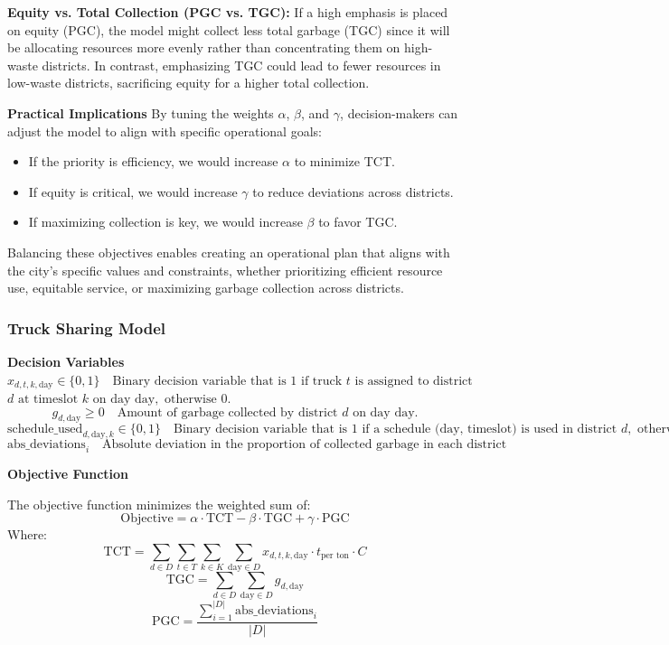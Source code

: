 \documentclass{article}
\begin{document}
\textbf{{Equity vs. Total Collection (PGC vs. TGC):}}
If a high emphasis is placed on equity (PGC), the model might collect less total garbage (TGC) since it will be allocating resources more evenly rather than concentrating them on high-waste districts. In contrast, emphasizing TGC could lead to fewer resources in low-waste districts, sacrificing equity for a higher total collection.

\textbf{{Practical Implications}}
By tuning the weights $\alpha$, $\beta$, and $\gamma$, decision-makers can adjust the model to align with specific operational goals:

\begin{itemize}
    \item If the priority is efficiency, we would increase $\alpha$ to minimize TCT.
    \item If equity is critical, we would increase $\gamma$ to reduce deviations across districts.
    \item If maximizing collection is key, we would increase $\beta$ to favor TGC.
\end{itemize}

Balancing these objectives enables creating an operational plan that aligns with the city’s specific values and constraints, whether prioritizing efficient resource use, equitable service, or maximizing garbage collection across districts.



\subsubsection{Truck Sharing Model}

\textbf{Decision Variables}
$
x_{d,t,k,\text{day}} \in \{0,1\} \quad \text{Binary decision variable that is 1 if truck }  t \text{ is assigned to district }$ $ d \text{ at timeslot } k 
\text{ on day } \text{day}, \text{ otherwise 0.}
$
\[
g_{d,\text{day}} \geq 0 \quad \text{Amount of garbage collected by district } d \text{ on day } \text{day.}
\]
\[
\text{schedule\_used}_{d,\text{day},k} \in \{0, 1\} \quad \text{Binary decision variable that is 1 if a schedule (day, timeslot) is used in district } d, \text{ otherwise 0.}
\]
\[
\text{abs\_deviations}_i \quad \text{Absolute deviation in the proportion of collected garbage in each district compared to the mean proportion.}
\]

\textbf{Objective Function}

The objective function minimizes the weighted sum of:
\[
\text{Objective} = \alpha \cdot \text{TCT} - \beta \cdot \text{TGC} + \gamma \cdot \text{PGC}
\]
Where:
\[
\text{TCT} = \sum_{d \in D} \sum_{t \in T} \sum_{k \in K} \sum_{\text{day} \in D} x_{d,t,k,\text{day}} \cdot t_{\text{per ton}} \cdot C
\]
\[
\text{TGC} = \sum_{d \in D} \sum_{\text{day} \in D} g_{d,\text{day}}
\]
\[
\text{PGC} = \frac{\sum_{i=1}^{|D|} \text{abs\_deviations}_i}{|D|}
\]
\end{document}
